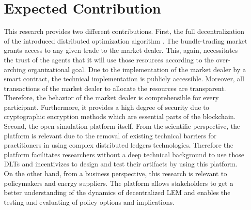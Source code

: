 \section{Expected Contribution}
\label{sec:expected_contribution}

This research provides two different contributions. 
First, the full decentralization of the introduced distributed 
optimization algorithm . 
The bundle-trading market grants access to any given trade to the market dealer. 
This, again, necessitates the trust of the agents that it will use those resources
according to the over-arching organizational goal. Due to the implementation 
of the market dealer by a smart contract, the technical implementation 
is publicly accessible. Moreover, all transactions of the market dealer 
to allocate the resources are transparent. Therefore, the behavior of the 
market dealer is comprehensible for every participant. Furthermore, it provides 
a high degree of security due to cryptographic encryption methods which are essential 
parts of the blockchain.
Second, the open simulation platform itself. From the scientific perspective, 
the platform is relevant due to the removal of existing technical barriers 
for practitioners in using complex distributed ledgers technologies. 
Therefore the platform facilitates researchers without a deep 
technical background to use those DLTs and incentivizes to design 
and test their artifacts by using this platform. 
On the other hand, from a business perspective, this research is 
relevant to policymakers and energy suppliers. The platform allows 
stakeholders to get a better understanding of the dynamics of decentralized 
LEM and enables the testing and evaluating of policy options and implications. 

\clearpage